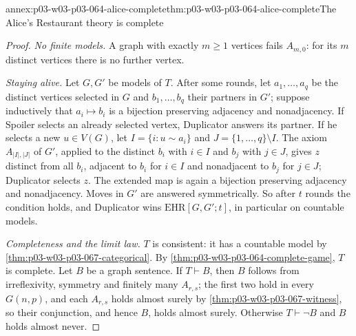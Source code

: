 \begin{annexitem}{annex:p03-w03-p03-064-alice-complete}{thm:p03-w03-p03-064-alice-complete}{The Alice's Restaurant theory is complete}
\begin{proof}
\emph{No finite models.}  A graph with exactly \(m\geq1\) vertices fails
\(A_{m,0}\): for its \(m\) distinct vertices there is no further vertex.

\emph{Staying alive.}  Let \(G,G'\) be models of \(T\).  After some rounds,
let \(a_1,\ldots,a_q\) be the distinct vertices selected in \(G\) and
\(b_1,\ldots,b_q\) their partners in \(G'\); suppose inductively that
\(a_i\mapsto b_i\) is a bijection preserving adjacency and nonadjacency.  If
Spoiler selects an already selected vertex, Duplicator answers its partner.
If he selects a new \(u\in V(G)\), let \(I=\{i:u\sim a_i\}\) and
\(J=\{1,\ldots,q\}\setminus I\).  The axiom \(A_{|I|,|J|}\) of \(G'\), applied
to the distinct \(b_i\) with \(i\in I\) and \(b_j\) with \(j\in J\), gives
\(z\) distinct from all \(b_i\), adjacent to \(b_i\) for \(i\in I\) and
nonadjacent to \(b_j\) for \(j\in J\); Duplicator selects \(z\).  The
extended map is again a bijection preserving adjacency and nonadjacency.
Moves in \(G'\) are answered symmetrically.  So after \(t\) rounds the
condition holds, and Duplicator wins \(\mathrm{EHR}[G,G';t]\), in particular
on countable models.

\emph{Completeness and the limit law.}  \(T\) is consistent: it has a
countable model by \cref{thm:p03-w03-p03-067-categorical}.  By
\cref{thm:p03-w03-p03-064-complete-game}, \(T\) is complete.  Let \(B\) be a
graph sentence.  If \(T\vdash B\), then \(B\) follows from irreflexivity,
symmetry and finitely many \(A_{r,s}\); the first two hold in every
\(G(n,p)\), and each \(A_{r,s}\) holds almost surely by
\cref{thm:p03-w03-p03-067-witness}, so their conjunction, and hence \(B\),
holds almost surely.  Otherwise \(T\vdash\neg B\) and \(B\) holds almost
never.
\end{proof}
\end{annexitem}

